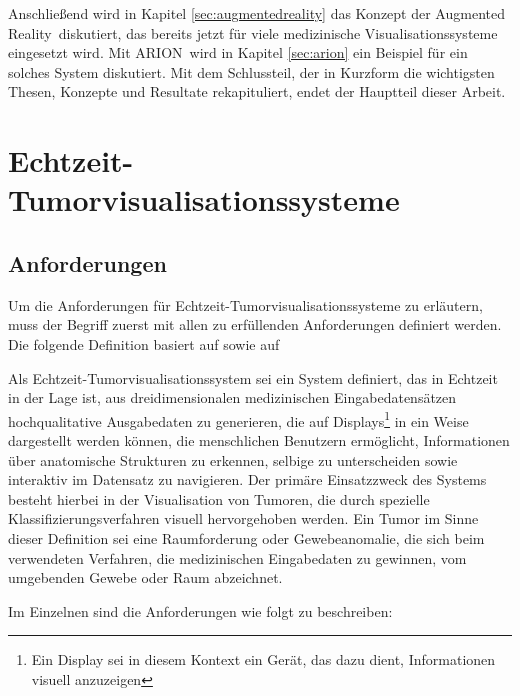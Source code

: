 \documentclass[pdftex,a4paper,titlepage,12pt]{scrartcl}
\newtheorem[L]{boxedDefinition}{Definition}
\begin{document}
Anschließend wird in Kapitel \vref{sec:augmentedreality} das Konzept der \glqq Augmented Reality\grqq\ diskutiert, das bereits jetzt für viele medizinische Visualisationssysteme eingesetzt wird. Mit ARION\texttrademark\  wird in Kapitel \vref{sec:arion} ein Beispiel für ein solches System diskutiert.
Mit dem Schlussteil, der in Kurzform die wichtigsten Thesen, Konzepte und Resultate rekapituliert, endet der Hauptteil dieser Arbeit.
\section{Echtzeit-Tumorvisualisationssysteme}\label{sec:vissystems}
\subsection{Anforderungen}\label{ssec:requirements}
Um die Anforderungen für Echtzeit-Tumorvisualisationssysteme zu erläutern, muss der Begriff zuerst mit allen zu erfüllenden Anforderungen definiert werden. Die folgende Definition basiert auf \cite[Kapitel 3.1.1, Seite 17]{Bruckner2004} sowie auf \cite{Kutter2008}
\begin{boxedDefinition}\label{def:rttumorvissystem}
 Als Echtzeit-Tumorvisualisationssystem sei ein System definiert, das in Echtzeit in der Lage ist, aus dreidimensionalen medizinischen Eingabedatensätzen hochqualitative Ausgabedaten zu generieren, die auf Displays\footnote{Ein Display sei in diesem Kontext ein Gerät, das dazu dient, Informationen visuell anzuzeigen} in ein Weise dargestellt werden können, die menschlichen Benutzern ermöglicht, Informationen über anatomische Strukturen zu erkennen, selbige zu unterscheiden sowie interaktiv im Datensatz zu navigieren. Der primäre Einsatzzweck des Systems besteht hierbei in der Visualisation von Tumoren, die durch spezielle Klassifizierungsverfahren visuell hervorgehoben werden.
 Ein Tumor im Sinne dieser Definition sei eine Raumforderung oder Gewebeanomalie, die sich beim verwendeten Verfahren, die medizinischen Eingabedaten zu gewinnen, vom umgebenden Gewebe oder Raum abzeichnet.
\end{boxedDefinition}
\newpage
\noindent Im Einzelnen sind die Anforderungen wie folgt zu beschreiben:
\end{document}
